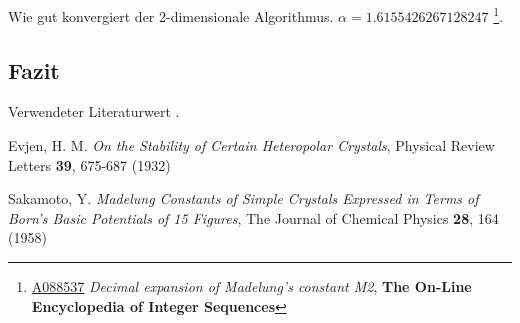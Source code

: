 \documentclass[10pt,a4paper]{article}
\begin{document}
Wie gut konvergiert der 2-dimensionale Algorithmus.
$\alpha = 1.6155426267128247$ \footnote{\href{https://oeis.org/A088537}{A088537} \emph{Decimal expansion of Madelung's constant M2}, \textbf{The On-Line Encyclopedia of Integer Sequences}}.

\subsection{Fazit}

Verwendeter Literaturwert  .


\begin{thebibliography}{9}

Evjen, H. M.
\emph{On the Stability of Certain Heteropolar Crystals},
Physical Review Letters \textbf{39},
675-687 (1932)

Sakamoto, Y.
\emph{Madelung Constants of Simple Crystals Expressed in Terms of Born's Basic
Potentials of 15 Figures},
The Journal of Chemical Physics \textbf{28},
164 (1958)

\end{thebibliography}
\end{document}

